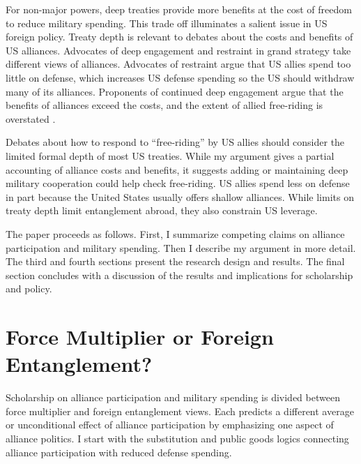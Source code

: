 \documentclass[12pt]{article}
\begin{document}


For non-major powers, deep treaties provide more benefits at the cost of freedom to reduce military spending. 
This trade off illuminates a salient issue in US foreign policy. 
Treaty depth is relevant to debates about the costs and benefits of US alliances.
Advocates of deep engagement \citep{Brooksetal2013} and restraint \citep{Posen2014} in grand strategy take different views of alliances. 
Advocates of restraint argue that US allies spend too little on defense, which increases US defense spending \citep{Preble2009} so the US should withdraw many of its alliances.
Proponents of continued deep engagement argue that the benefits of alliances exceed the costs, and the extent of allied free-riding is overstated \citep{BrandsFeaver2017}. 


Debates about how to respond to ``free-riding'' by US allies should consider the limited formal depth of most US treaties.
While my argument gives a partial accounting of alliance costs and benefits, it suggests adding or maintaining deep military cooperation could help check free-riding.   
US allies spend less on defense in part because the United States usually offers shallow alliances. 
While limits on treaty depth limit entanglement abroad, they also constrain US leverage. 


The paper proceeds as follows. 
First, I summarize competing claims on alliance participation and military spending. 
Then I describe my argument in more detail. 
The third and fourth sections present the research design and results. 
The final section concludes with a discussion of the results and implications for scholarship and policy.  



\section{Force Multiplier or Foreign Entanglement?}


Scholarship on alliance participation and military spending is divided between force multiplier and foreign entanglement views.
Each predicts a different average or unconditional effect of alliance participation by emphasizing one aspect of alliance politics.  
I start with the substitution and public goods logics connecting alliance participation with reduced defense spending. 
\end{document}
